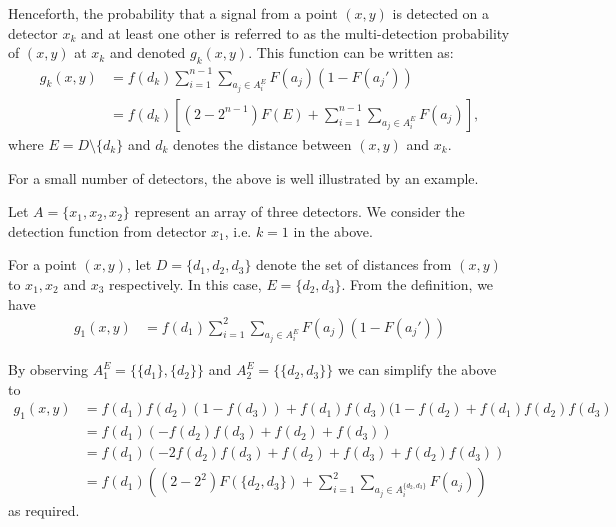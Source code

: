 \documentclass{lms}
\begin{document}
Henceforth, the probability that a signal from a point $(x, y)$ is detected on a detector $x_k$ and at least one other is referred to as the multi-detection probability of $(x, y)$ at $x_k$ and denoted $g_k(x, y)$. This function can be written as:
\begin{equation}
\begin{split}
g_k(x, y) & = f(d_k)\sum\limits_{i = 1}^{n - 1} \sum\limits_{a_j \in A_i^{E}} F(a_j)(1 - F(a_j')) \\
& = f(d_k) \left[(2 - 2^{n-1})F(E) + \sum\limits_{i = 1}^{n - 1} \sum\limits_{a_j \in A_i^{E}}F(a_j)\right],
\end{split}
\end{equation}
where $E = D \setminus \{d_k\}$ and $d_k$ denotes the distance between $(x, y)$ and $x_k$.

\vspace{0.1in}
For a small number of detectors, the above is well illustrated by an example.

\begin{example}
Let $A = \{x_1, x_2, x_2\}$ represent an array of three detectors. We consider
the detection function from detector $x_1$, i.e. $k = 1$ in the above.
\vspace{0.1in}

For a point $(x, y)$, let $D = \{d_1, d_2, d_3\}$ denote the set of distances from $(x, y)$ to $x_1, x_2$ and $x_3$ respectively. In this case, $E = \{d_2, d_3\}$. From the definition, we have
\begin{equation}
\begin{split}
g_1(x, y) & = f(d_1)\sum\limits_{i = 1}^{2} \sum\limits_{a_j \in A_i^{E}} F(a_j)(1 - F(a_j')) 
\end{split}
\end{equation}

By observing $A_1^E = \{\{d_1\}, \{d_2\}\}$ and $A_2^E = \{\{d_2, d_3\}\}$ we can simplify the above to
\begin{equation}
\begin{split}
g_1(x, y)  & = f(d_1)f(d_2)(1 - f(d_3)) + f(d_1)f(d_3)(1 - f(d_2) +  f(d_1)f(d_2)f(d_3) \\
& = f(d_1)(- f(d_2)f(d_3) + f(d_2) + f(d_3))\\
& = f(d_1)\left(-2f(d_2)f(d_3)+ f(d_2) + f(d_3) + f(d_2)f(d_3)\right) \\
& = f(d_1)\left((2 - 2^{2})F(\{d_2, d_3\}) + \sum\limits_{i = 1}^{2}\sum\limits_{a_j \in A_i^{\{d_2, d_3\}}} F(a_j)\right)
\end{split}
\end{equation}
as required.
\end{example}
\end{document}
